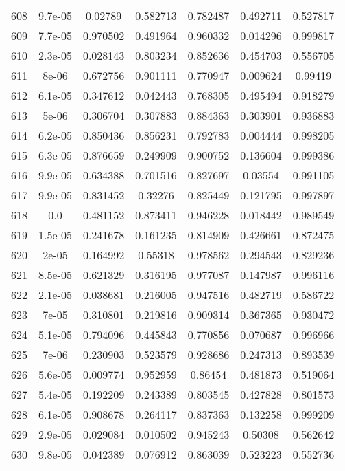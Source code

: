 \begin{table}
\begin{tabular}{c|c|c|c|c|c|c}
608 & 9.7e-05 & 0.02789 & 0.582713 & 0.782487 & 0.492711 & 0.527817\\
609 & 7.7e-05 & 0.970502 & 0.491964 & 0.960332 & 0.014296 & 0.999817\\
610 & 2.3e-05 & 0.028143 & 0.803234 & 0.852636 & 0.454703 & 0.556705\\
611 & 8e-06 & 0.672756 & 0.901111 & 0.770947 & 0.009624 & 0.99419\\
612 & 6.1e-05 & 0.347612 & 0.042443 & 0.768305 & 0.495494 & 0.918279\\
613 & 5e-06 & 0.306704 & 0.307883 & 0.884363 & 0.303901 & 0.936883\\
614 & 6.2e-05 & 0.850436 & 0.856231 & 0.792783 & 0.004444 & 0.998205\\
615 & 6.3e-05 & 0.876659 & 0.249909 & 0.900752 & 0.136604 & 0.999386\\
616 & 9.9e-05 & 0.634388 & 0.701516 & 0.827697 & 0.03554 & 0.991105\\
617 & 9.9e-05 & 0.831452 & 0.32276 & 0.825449 & 0.121795 & 0.997897\\
618 & 0.0 & 0.481152 & 0.873411 & 0.946228 & 0.018442 & 0.989549\\
619 & 1.5e-05 & 0.241678 & 0.161235 & 0.814909 & 0.426661 & 0.872475\\
620 & 2e-05 & 0.164992 & 0.55318 & 0.978562 & 0.294543 & 0.829236\\
621 & 8.5e-05 & 0.621329 & 0.316195 & 0.977087 & 0.147987 & 0.996116\\
622 & 2.1e-05 & 0.038681 & 0.216005 & 0.947516 & 0.482719 & 0.586722\\
623 & 7e-05 & 0.310801 & 0.219816 & 0.909314 & 0.367365 & 0.930472\\
624 & 5.1e-05 & 0.794096 & 0.445843 & 0.770856 & 0.070687 & 0.996966\\
625 & 7e-06 & 0.230903 & 0.523579 & 0.928686 & 0.247313 & 0.893539\\
626 & 5.6e-05 & 0.009774 & 0.952959 & 0.86454 & 0.481873 & 0.519064\\
627 & 5.4e-05 & 0.192209 & 0.243389 & 0.803545 & 0.427828 & 0.801573\\
628 & 6.1e-05 & 0.908678 & 0.264117 & 0.837363 & 0.132258 & 0.999209\\
629 & 2.9e-05 & 0.029084 & 0.010502 & 0.945243 & 0.50308 & 0.562642\\
630 & 9.8e-05 & 0.042389 & 0.076912 & 0.863039 & 0.523223 & 0.552736\\
\end{tabular}
\end{table}
